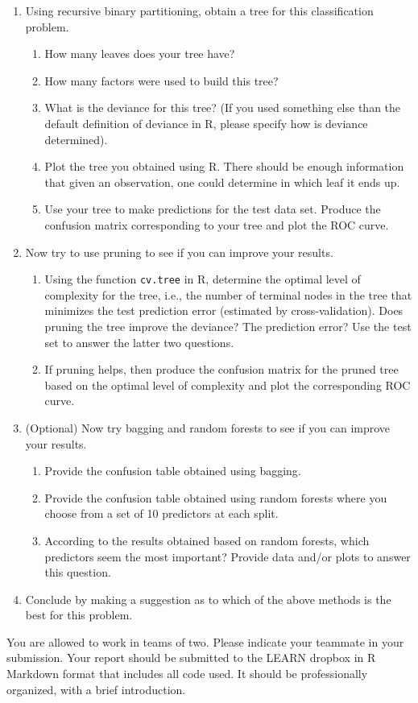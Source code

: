 \documentclass[11pt]{article}
\begin{document}
\begin{enumerate}
\item Using recursive binary partitioning, obtain a tree for this classification problem.
  \begin{enumerate}
  \item How many leaves does your tree have?
    \item How many factors were used to build this tree?
  \item What is the deviance for this tree? (If you used something else than the default definition of deviance in R, please specify how is deviance determined).
  \item Plot the tree you obtained using R. There should be enough information that given an observation, one could determine in which leaf it ends up. %
    \item Use your tree to make predictions for the test data set. Produce the confusion matrix corresponding to your tree and plot the ROC curve.
  \end{enumerate}
\item Now try to use pruning to see if you can improve your results.
  \begin{enumerate}
  \item Using the function {\tt cv.tree} in R,  determine the optimal level of complexity for the tree, i.e., the number of terminal nodes in the tree that minimizes the test prediction error (estimated by cross-validation). Does pruning the tree improve the deviance? The prediction error? Use the test set to answer the latter two questions.
    \item If pruning helps, then produce the confusion matrix for the pruned tree based on the optimal level of complexity and plot the corresponding ROC curve.
  \end{enumerate}
  
\item (Optional) Now try bagging and random forests to see if you can improve your results.
  \begin{enumerate}
  \item Provide the confusion table obtained using bagging.
  \item Provide the confusion table obtained using random forests where you choose from a set of 10 predictors at each split. %
      \item According to the results obtained based on random forests, which predictors seem the most important? Provide data and/or plots to answer this question.
  \end{enumerate}
  \item Conclude by making a suggestion as to which of the above methods is the best for this problem.
\end{enumerate}

You are allowed to work in teams of two. Please indicate your teammate in your submission.
Your report should be submitted to the LEARN dropbox in R Markdown format that includes all code used. 
It should be professionally organized, with a brief introduction.
\end{document}
